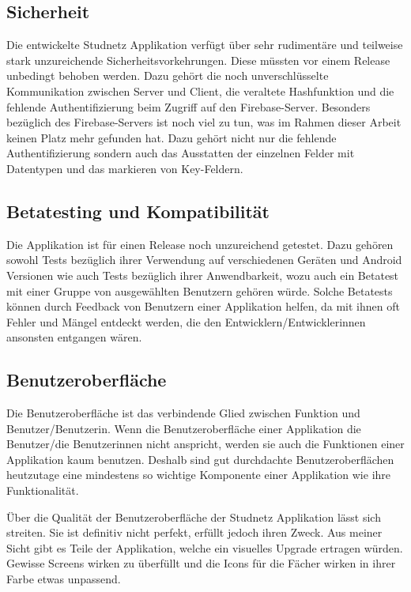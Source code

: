 \documentclass[../main.tex]{subfiles}
\begin{document}
	\subsection*{Sicherheit}
	Die entwickelte Studnetz Applikation verfügt über sehr rudimentäre und teilweise stark unzureichende Sicherheitsvorkehrungen. Diese müssten vor einem Release unbedingt behoben werden. Dazu gehört die noch unverschlüsselte Kommunikation zwischen Server und Client, die veraltete Hashfunktion und die fehlende Authentifizierung beim Zugriff auf den Firebase-Server. Besonders bezüglich des Firebase-Servers ist noch viel zu tun, was im Rahmen dieser Arbeit keinen Platz mehr gefunden hat. Dazu gehört nicht nur die fehlende Authentifizierung sondern auch das Ausstatten der einzelnen Felder mit Datentypen und das markieren von Key-Feldern.
	
	
	\subsection*{Betatesting und Kompatibilität}
	Die Applikation ist für einen Release noch unzureichend getestet. Dazu gehören sowohl Tests bezüglich ihrer Verwendung auf verschiedenen Geräten und Android Versionen wie auch Tests bezüglich ihrer Anwendbarkeit, wozu auch ein Betatest mit einer Gruppe von ausgewählten Benutzern gehören würde. Solche Betatests können durch Feedback von Benutzern einer Applikation helfen, da mit ihnen oft Fehler und Mängel entdeckt werden, die den Entwicklern/Entwicklerinnen ansonsten entgangen wären.
	
	\subsection*{Benutzeroberfläche}
	Die Benutzeroberfläche ist das verbindende Glied zwischen Funktion und Benutzer/Benutzerin. Wenn die Benutzeroberfläche einer Applikation die Benutzer/die Benutzerinnen nicht anspricht, werden sie auch die Funktionen einer Applikation kaum benutzen. Deshalb sind gut durchdachte Benutzeroberflächen heutzutage eine mindestens so wichtige Komponente einer Applikation wie ihre Funktionalität.
	
	Über die Qualität der Benutzeroberfläche der Studnetz Applikation lässt sich streiten. Sie ist definitiv nicht perfekt, erfüllt jedoch ihren Zweck. Aus meiner Sicht gibt es Teile der Applikation, welche ein visuelles Upgrade ertragen würden. Gewisse Screens wirken zu überfüllt und die Icons für die Fächer wirken in ihrer Farbe etwas unpassend.
	
\end{document}
